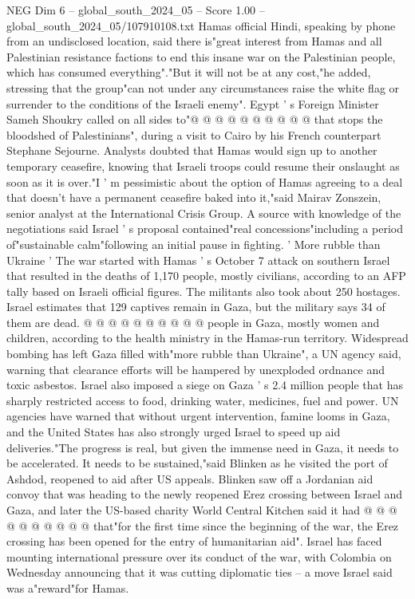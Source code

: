 \begin{textsample}{NEG Dim 6 – global\_south\_2024\_05 – Score 1.00 – global\_south\_2024\_05/107910108.txt}
Hamas official Hindi, speaking by phone from an undisclosed location, said there is"great interest from Hamas and all Palestinian resistance factions to end this insane war on the Palestinian people, which has consumed everything"."But it will not be at any cost,"he added, stressing that the group"can not under any circumstances raise the white flag or surrender to the conditions of the Israeli enemy".
Egypt ' s Foreign Minister Sameh Shoukry called on all sides to"@ @ @ @ @ @ @ @ @ @ that stops the bloodshed of Palestinians", during a visit to Cairo by his French counterpart Stephane Sejourne.
Analysts doubted that Hamas would sign up to another temporary ceasefire, knowing that Israeli troops could resume their onslaught as soon as it is over."I ' m pessimistic about the option of Hamas agreeing to a deal that doesn't have a permanent ceasefire baked into it,"said Mairav Zonszein, senior analyst at the International Crisis Group.
A source with knowledge of the negotiations said Israel ' s proposal contained"real concessions"including a period of"sustainable calm"following an initial pause in fighting. ' More rubble than Ukraine ' The war started with Hamas ' s October 7 attack on southern Israel that resulted in the deaths of 1,170 people, mostly civilians, according to an AFP tally based on Israeli official figures.
The militants also took about 250 hostages.
Israel estimates that 129 captives remain in Gaza, but the military says 34 of them are dead. @ @ @ @ @ @ @ @ @ @ people in Gaza, mostly women and children, according to the health ministry in the Hamas-run territory.
Widespread bombing has left Gaza filled with"more rubble than Ukraine", a UN agency said, warning that clearance efforts will be hampered by unexploded ordnance and toxic asbestos.
Israel also imposed a siege on Gaza ' s 2.4 million people that has sharply restricted access to food, drinking water, medicines, fuel and power.
UN agencies have warned that without urgent intervention, famine looms in Gaza, and the United States has also strongly urged Israel to speed up aid deliveries."The progress is real, but given the immense need in Gaza, it needs to be accelerated.
It needs to be sustained,"said Blinken as he visited the port of Ashdod, reopened to aid after US appeals.
Blinken saw off a Jordanian aid convoy that was heading to the newly reopened Erez crossing between Israel and Gaza, and later the US-based charity World Central Kitchen said it had @ @ @ @ @ @ @ @ @ @ that"for the first time since the beginning of the war, the Erez crossing has been opened for the entry of humanitarian aid".
Israel has faced mounting international pressure over its conduct of the war, with Colombia on Wednesday announcing that it was cutting diplomatic ties -- a move Israel said was a"reward"for Hamas.

\end{textsample}
